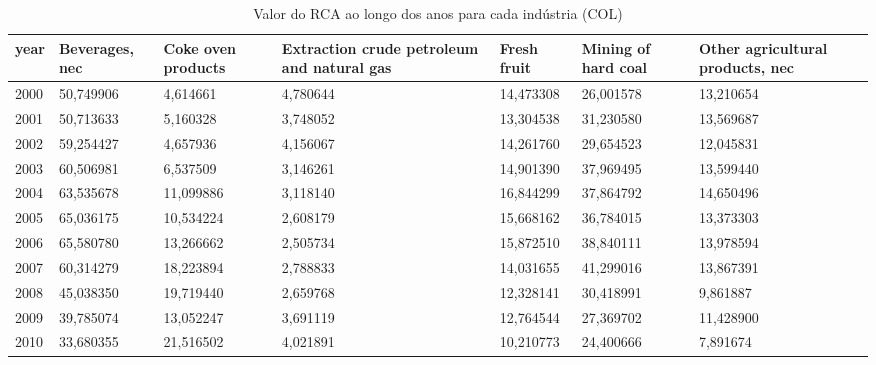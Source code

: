 \begin{table}
\centering
\caption{Valor do RCA ao longo dos anos para cada indústria (COL)}
\begin{tabular}{p{1cm}p{2cm}p{2cm}p{2cm}p{2cm}p{2cm}p{2cm}}
\toprule
 year &  Beverages, nec &  Coke oven products &  Extraction crude petroleum and natural gas &  Fresh fruit &  Mining of hard coal &  Other agricultural products, nec \\
\midrule
 2000 &       50,749906 &            4,614661 &                                    4,780644 &    14,473308 &            26,001578 &                         13,210654 \\
 2001 &       50,713633 &            5,160328 &                                    3,748052 &    13,304538 &            31,230580 &                         13,569687 \\
 2002 &       59,254427 &            4,657936 &                                    4,156067 &    14,261760 &            29,654523 &                         12,045831 \\
 2003 &       60,506981 &            6,537509 &                                    3,146261 &    14,901390 &            37,969495 &                         13,599440 \\
 2004 &       63,535678 &           11,099886 &                                    3,118140 &    16,844299 &            37,864792 &                         14,650496 \\
 2005 &       65,036175 &           10,534224 &                                    2,608179 &    15,668162 &            36,784015 &                         13,373303 \\
 2006 &       65,580780 &           13,266662 &                                    2,505734 &    15,872510 &            38,840111 &                         13,978594 \\
 2007 &       60,314279 &           18,223894 &                                    2,788833 &    14,031655 &            41,299016 &                         13,867391 \\
 2008 &       45,038350 &           19,719440 &                                    2,659768 &    12,328141 &            30,418991 &                          9,861887 \\
 2009 &       39,785074 &           13,052247 &                                    3,691119 &    12,764544 &            27,369702 &                         11,428900 \\
 2010 &       33,680355 &           21,516502 &                                    4,021891 &    10,210773 &            24,400666 &                          7,891674 \\

\end{tabular}
\end{table}
